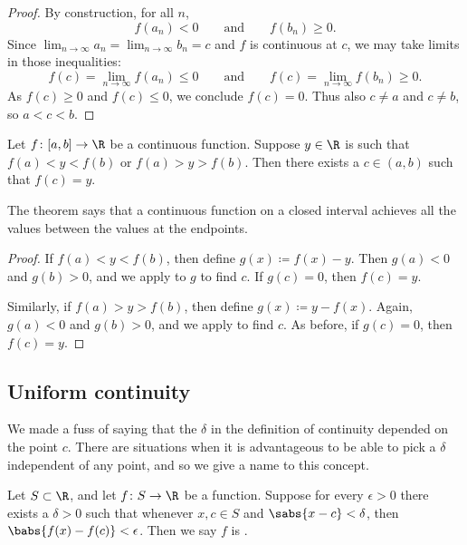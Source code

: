 \begin{proof}
By construction, for all $n$,
\begin{equation*}
f(a_n) < 0
\qquad \text{and} \qquad
f(b_n) \geq 0 .
\end{equation*}
Since
$\lim_{n\to\infty} a_n = \lim_{n\to\infty} b_n = c$
and $f$ is continuous at $c$, we may take 
limits in those inequalities:
\begin{equation*}
f(c) = \lim_{n\to\infty} f(a_n) \leq 0
\qquad \text{and} \qquad
f(c) = \lim_{n\to\infty} f(b_n) \geq 0 .
\end{equation*}
As $f(c) \geq 0$ and 
$f(c) \leq 0$, we conclude $f(c) = 0$.
Thus also $c \neq a$ and $c \neq b$, so
$a < c < b$.
\end{proof}

\begin{thm} \label{IVT:thm}
Let $f \colon [a,b] \to \R$ be a continuous function.
Suppose $y \in \R$ is such that $f(a) < y < f(b)$
or $f(a) > y > f(b)$.  Then there exists a $c \in (a,b)$
such that $f(c) = y$.
\end{thm}

The theorem says that a continuous function on a closed interval
achieves all the values between the values at the endpoints.

\begin{proof}
If $f(a) < y < f(b)$, then define $g(x) \coloneqq f(x)-y$.  Then 
$g(a) < 0$ and $g(b) > 0$, and we apply 
to $g$ to find $c$.  If $g(c) = 0$, then $f(c) = y$.

Similarly, if $f(a) > y > f(b)$, then define $g(x) \coloneqq y-f(x)$.
Again, $g(a) < 0$ and $g(b) > 0$, and we apply  to
find $c$.
As before, if $g(c) = 0$, then $f(c) = y$.
\end{proof}



\subsection{Uniform continuity}

We made a fuss of saying that the $\delta$ in the definition of
continuity depended on the point $c$.  There are situations when it is
advantageous to be able to pick a $\delta$ independent of any point, and so we
give a name to this concept.

\begin{defn}
Let $S \subset \R$, and let $f \colon S \to \R$ be a function.
Suppose for every $\epsilon > 0$ there exists a $\delta > 0$
such that whenever $x, c \in S$ and
$\sabs{x-c} < \delta$, then $\babs{f(x)-f(c)} < \epsilon$.
Then we say $f$ is \emph{}.
\end{defn}


